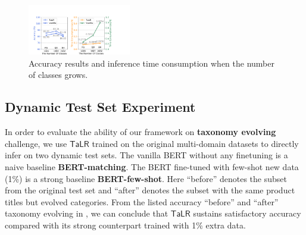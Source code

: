 \begin{figure}[thbp] \centering
    \includegraphics[width=0.4\textwidth]{time.pdf}
    \caption{Accuracy results and inference time consumption when the number of classes grows.} 
    \label{fig:time}
\end{figure}

\subsection{Dynamic Test Set Experiment}
\label{sec:evolve res}
In order to evaluate the ability of our framework on \textbf{taxonomy evolving} challenge, 
we use $\mathsf{TaLR}$ trained on the original multi-domain datasets to directly infer on two dynamic test sets. The vanilla BERT without any finetuning is a naive baseline \textbf{BERT-matching}. The BERT fine-tuned with few-shot new data (1\%) is a strong baseline \textbf{BERT-few-shot}.
Here ``before'' denotes the subset from the original test set and ``after'' denotes the subset with the same product titles but evolved categories.
From the listed accuracy ``before'' and ``after'' taxonomy evolving in , we can conclude that $\mathsf{TaLR}$ sustains satisfactory accuracy compared with its strong counterpart trained with 1\% extra data.

